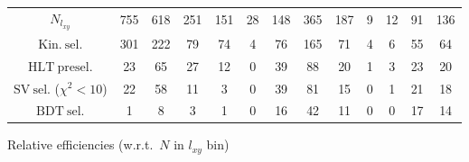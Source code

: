 \documentclass[10pt,a4paper]{article}
\begin{document}
\begin{landscape}
{\begin{tabular}{c|cccc|cccc|cccc}
\midrule
$N_{l_{xy}}$ & 755 & 618 & 251 & 151 & 28 & 148 & 365 & 187 & 9 & 12 & 91 & 136\\
$\mathrm{Kin.\ sel.}$ & 301 & 222 & 79 & 74 & 4 & 76 & 165 & 71 & 4 & 6 & 55 & 64\\
$\mathrm{HLT\ presel.}$ & 23 & 65 & 27 & 12 & 0 & 39 & 88 & 20 & 1 & 3 & 23 & 20\\
$\mathrm{SV\ sel.}$ ($\chi^2{<}10$) & 22 & 58 & 11 & 3 & 0 & 39 & 81 & 15 & 0 & 1 & 21 & 18\\
$\mathrm{BDT\ sel.}$ & 1 & 8 & 3 & 1 & 0 & 16 & 42 & 11 & 0 & 0 & 17 & 14\\
\bottomrule
\end{tabular}}

\vspace{18pt}

Relative efficiencies (w.r.t.\ $N$ in $l_{xy}$ bin)


\end{landscape}
\end{document}

